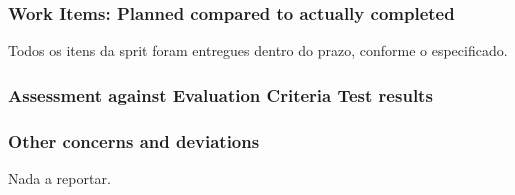 \subsubsection*{Work Items: Planned compared to actually completed}
Todos os itens da sprit foram entregues dentro do prazo, conforme o especificado. 

\subsubsection*{Assessment against Evaluation Criteria Test results}


\subsubsection*{Other concerns and deviations}
Nada a reportar.
